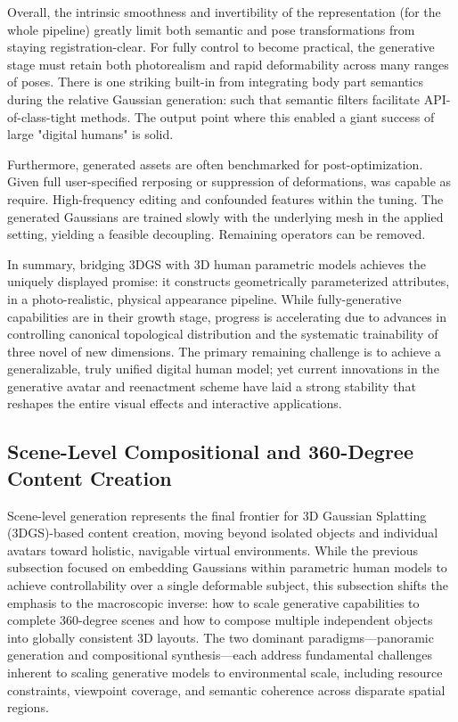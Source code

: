 \documentclass[11pt,a4paper]{article}
\begin{document}
Overall, the intrinsic smoothness and invertibility of the representation (for the whole pipeline) greatly limit both semantic and pose transformations from staying registration-clear. For fully control to become practical, the generative stage must retain both photorealism and rapid deformability across many ranges of poses. There is one striking built-in from integrating body part semantics during the relative Gaussian generation: such that semantic filters facilitate API-of-class-tight methods. The output point where this enabled a giant success of large "digital humans" is solid. 

Furthermore, generated assets are often benchmarked for post-optimization. Given full user-specified rerposing or suppression of deformations, was capable as require. High-frequency editing and confounded features within the tuning. The generated Gaussians are trained slowly with the underlying mesh in the applied setting, yielding a feasible decoupling. Remaining operators can be removed.

In summary, bridging 3DGS with 3D human parametric models achieves the uniquely displayed promise: it constructs geometrically parameterized attributes, in a photo-realistic, physical appearance pipeline. While fully-generative capabilities are in their growth stage, progress is accelerating due to advances in controlling canonical topological distribution and the systematic trainability of three novel of new dimensions. The primary remaining challenge is to achieve a generalizable, truly unified digital human model; yet current innovations in the generative avatar and reenactment scheme have laid a strong stability that reshapes the entire visual effects and interactive applications.


\subsection{Scene-Level Compositional and 360-Degree Content Creation}


Scene-level generation represents the final frontier for 3D Gaussian Splatting (3DGS)-based content creation, moving beyond isolated objects and individual avatars toward holistic, navigable virtual environments. While the previous subsection focused on embedding Gaussians within parametric human models to achieve controllability over a single deformable subject, this subsection shifts the emphasis to the macroscopic inverse: how to scale generative capabilities to complete 360-degree scenes and how to compose multiple independent objects into globally consistent 3D layouts. The two dominant paradigms---panoramic generation and compositional synthesis---each address fundamental challenges inherent to scaling generative models to environmental scale, including resource constraints, viewpoint coverage, and semantic coherence across disparate spatial regions.
\end{document}
